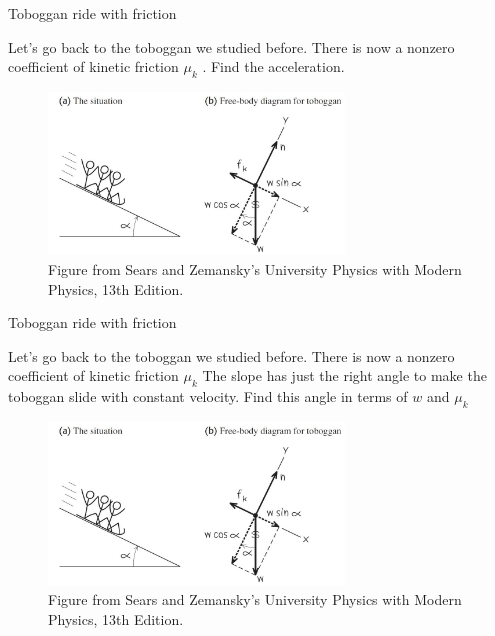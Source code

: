 \documentclass[]{beamer}
\begin{document}
\begin{frame}
  Toboggan ride with friction 
 \vspace{3mm}

 Let’s go back to the toboggan we studied before. There is now a nonzero coefficient 
 of kinetic friction $\mu_k$ . Find the acceleration.
         
  \begin{figure}[h!]  
    \includegraphics[width=0.7\textwidth]{images/f23.jpg}
    \caption{ {\tiny Figure from Sears and Zemansky's University Physics 
    with Modern Physics, 13th Edition.} }
  \end{figure}

        \end{frame}


      

\begin{frame}
  Toboggan ride with friction 
 \vspace{3mm}

 Let’s go back to the toboggan we studied before. There is now a nonzero coefficient 
 of kinetic friction $\mu_k$ The slope has just the right angle to make the toboggan
slide with constant velocity. Find this angle in terms of $w$ and $\mu_k$
         
  \begin{figure}[h!]  
    \includegraphics[width=0.7\textwidth]{images/f23.jpg}
    \caption{ {\tiny Figure from Sears and Zemansky's University Physics 
    with Modern Physics, 13th Edition.} }
  \end{figure}

        \end{frame}
\end{document}
